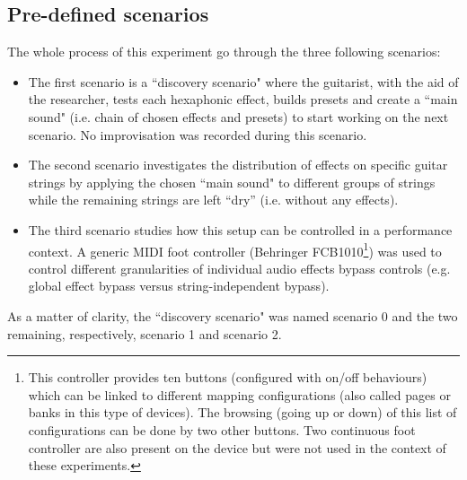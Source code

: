 \documentclass{article}
\begin{document}
\subsection{Pre-defined scenarios}
The whole process of this experiment go through the three following scenarios:
\begin{itemize}
    \item The first scenario is a ``discovery scenario" where the guitarist, with the aid of the researcher, tests each hexaphonic effect, builds presets and create a ``main sound" (i.e. chain of chosen effects and presets) to start working on the next scenario. No improvisation was recorded during this scenario.  
    
    \item The second scenario investigates the distribution of effects on specific guitar strings by applying the chosen ``main sound" to different groups of strings while the remaining strings are left ``dry'' (i.e. without any effects).
    
    \item The third scenario studies how this setup can be controlled in a performance context. A generic MIDI foot controller (Behringer FCB1010\footnote{\label{foot:Behringer1010}This controller provides ten buttons (configured with on/off behaviours) which can be linked to different mapping configurations (also called pages or banks in this type of devices). The browsing (going up or down) of this list of configurations can be done by two other buttons. Two continuous foot controller are also present on the device but were not used in the context of these experiments.}) was used to control different granularities of individual audio effects bypass controls (e.g. global effect bypass versus string-independent bypass). 
\end{itemize} 

As a matter of clarity, the ``discovery scenario" was named scenario 0 and the two remaining, respectively, scenario 1 and scenario 2.
\end{document}
